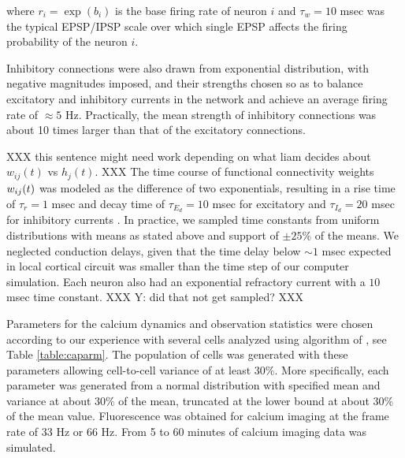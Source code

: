 \noindent where $r_i=\exp(b_i)$ is the base firing rate of neuron $i$ and $\tau_w=10$ msec was the typical EPSP/IPSP scale over which single EPSP affects the firing probability of the neuron $i$.  %
%

Inhibitory connections were also drawn from exponential distribution, with negative magnitudes imposed, and their strengths chosen so as to balance excitatory and inhibitory currents in the network and achieve an average firing rate of  $\approx 5 $ Hz. Practically, the mean strength of inhibitory connections was about 10 times larger than that of the excitatory connections.

XXX this sentence might need work depending on what liam decides about $w_{ij}(t)$ vs $h_j(t)$. XXX The time course of functional connectivity weights $w_{ij}(t)$ was modeled as the difference of two exponentials, resulting in a rise time of $\tau_r=1$ msec and decay time of $\tau_{E_d}=10$ msec for excitatory and $\tau_{I_d}=20$ msec for inhibitory currents \cite{Sayer1990}. In practice, we sampled time constants from uniform distributions with means as stated above and support of $\pm 25 \%$ of the means. We neglected conduction delays, given that the time delay below $\sim 1$ msec expected in local cortical circuit was smaller than the time step of our computer simulation.  Each neuron also had an exponential refractory current with a $10$ msec time constant. XXX Y: did that not get sampled? XXX

Parameters for the calcium dynamics and observation statistics were chosen according to our experience with several cells analyzed using algorithm of \cite{Vogelstein2009}, see Table \ref{table:caparm}.  The population of cells was generated with these parameters allowing cell-to-cell variance of at least 30\%. More specifically, each parameter was generated from a normal distribution with specified mean and variance at about 30\% of the mean, truncated at the lower bound at about 30\% of the mean value. Fluorescence was obtained for calcium imaging at the frame rate of 33 Hz or 66 Hz.  From 5 to 60 minutes of calcium imaging data was simulated.

